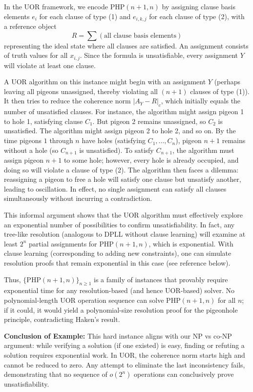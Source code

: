 \documentclass{article}
\begin{document}
\medskip
In the UOR framework, we encode $\mathrm{PHP}(n+1,n)$ by assigning clause basis elements $e_{i}$ for each clause of type (1) and $e_{i,k,j}$ for each clause of type (2), with a reference object 
\[
R = \sum (\text{all clause basis elements})
\]
representing the ideal state where all clauses are satisfied. An assignment consists of truth values for all $x_{i,j}$. Since the formula is unsatisfiable, every assignment $Y$ will violate at least one clause.

A UOR algorithm on this instance might begin with an assignment $Y$ (perhaps leaving all pigeons unassigned, thereby violating all $(n+1)$ clauses of type (1)). It then tries to reduce the coherence norm $|A_Y - R|_c$, which initially equals the number of unsatisfied clauses. For instance, the algorithm might assign pigeon 1 to hole 1, satisfying clause $C_1$. But pigeon 2 remains unassigned, so $C_2$ is unsatisfied. The algorithm might assign pigeon 2 to hole 2, and so on. By the time pigeons $1$ through $n$ have holes (satisfying $C_1, \dots, C_n$), pigeon $n+1$ remains without a hole (so $C_{n+1}$ is unsatisfied). To satisfy $C_{n+1}$, the algorithm must assign pigeon $n+1$ to some hole; however, every hole is already occupied, and doing so will violate a clause of type (2). The algorithm then faces a dilemma: reassigning a pigeon to free a hole will satisfy one clause but unsatisfy another, leading to oscillation. In effect, no single assignment can satisfy all clauses simultaneously without incurring a contradiction.

\medskip
This informal argument shows that the UOR algorithm must effectively explore an exponential number of possibilities to confirm unsatisfiability. In fact, any tree-like resolution (analogous to DPLL without clause learning) will examine at least $2^n$ partial assignments for $\mathrm{PHP}(n+1,n)$, which is exponential. With clause learning (corresponding to adding new constraints), one can simulate resolution proofs that remain exponential in this case (see reference below).

\medskip
Thus, $\{\mathrm{PHP}(n+1,n)\}_{n\ge1}$ is a family of instances that provably require exponential time for any resolution-based (and hence UOR-based) solver. No polynomial-length UOR operation sequence can solve $\mathrm{PHP}(n+1,n)$ for all $n$; if it could, it would yield a polynomial-size resolution proof for the pigeonhole principle, contradicting Haken’s result.

\medskip
\textbf{Conclusion of Example:} This hard instance aligns with our NP vs co-NP argument: while verifying a solution (if one existed) is easy, finding or refuting a solution requires exponential work. In UOR, the coherence norm starts high and cannot be reduced to zero. Any attempt to eliminate the last inconsistency fails, demonstrating that no sequence of $o(2^n)$ operations can conclusively prove unsatisfiability.
\end{document}
